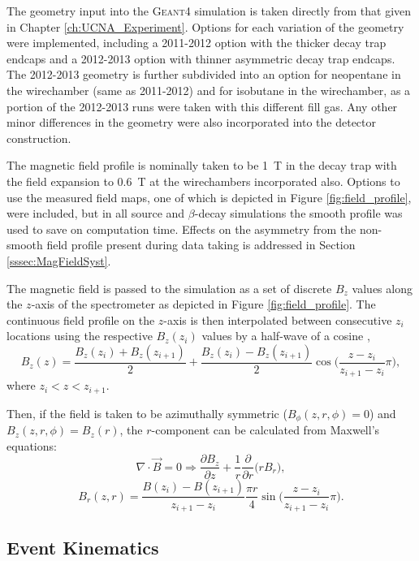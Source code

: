 The geometry input into the \textsc{Geant4} simulation is taken directly from
that given in Chapter \ref{ch:UCNA_Experiment}. Options for each variation
of the geometry were implemented, including a 2011-2012 option with
the thicker decay trap endcaps and a 2012-2013 option with thinner asymmetric
decay trap endcaps. The 2012-2013 geometry is further subdivided into an option
for neopentane in the wirechamber (same as 2011-2012) and for isobutane in the
wirechamber, as a portion of the 2012-2013 runs were taken with this
different fill gas. Any other minor differences in the geometry were also
incorporated into the detector construction.

The magnetic field profile is nominally taken to be 1~T in the decay trap
with the field expansion to 0.6~T at the wirechambers incorporated also.
Options to use the measured field maps, one of which is depicted in
Figure \ref{fig:field_profile}, were included, but in all source
and $\beta$-decay simulations the smooth profile was used to save on
computation time. Effects on the asymmetry from the non-smooth
field profile present during data taking is addressed in
Section \ref{sssec:MagFieldSyst}.

The magnetic field is passed to the simulation as a set of discrete $B_z$
values along the $z$-axis of the spectrometer as depicted in Figure \ref{fig:field_profile}.
The continuous field profile on the $z$-axis is then interpolated between consecutive $z_i$ locations
using the respective $B_z(z_i)$ values by a half-wave of a cosine \cite{yuan2006progress},
%
\begin{equation}
  B_z(z) = \frac{B_z(z_i) + B_z(z_{i+1})}{2} + \frac{B_z(z_i) - B_z(z_{i+1})}{2}\cos\bigg(\frac{z-z_i}{z_{i+1}-z_i}\pi\bigg),
\end{equation}
%
where $z_i<z<z_{i+1}$.

Then, if the field is taken to be azimuthally symmetric ($B_\phi(z,r,\phi)=0$) and $B_z(z,r,\phi)=B_z(r)$,
the $r$-component can be calculated from Maxwell's equations:
%
\begin{equation}
  \nabla \cdot \vec{B} = 0 \Rightarrow \frac{\partial B_z}{\partial z} + \frac{1}{r}\frac{\partial}{\partial r}\big(rB_r\big), 
\end{equation}
\begin{equation}
  B_r(z,r) =  \frac{B(z_i) - B(z_{i+1})}{z_{i+1}-z_i}\frac{\pi r}{4}\sin\bigg(\frac{z-z_i}{z_{i+1}-z_i}\pi\bigg).
\end{equation}
%


\subsection{Event Kinematics}

